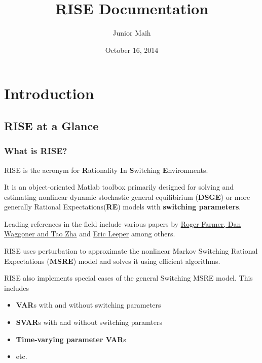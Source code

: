 \documentclass[letterpaper,10pt,english]{sphinxmanual}
\title{RISE Documentation}
\date{October 16, 2014}
\author{Junior Maih}
\begin{document}
\maketitle
\tableofcontents
{}\label{master_doc::doc}



\chapter{Introduction}
\label{introduction:introduction}\label{introduction::doc}\label{introduction:welcome-to-rise-s-documentation}

\section{RISE at a Glance}
\label{intro_folder/rise_at_a_glance::doc}\label{intro_folder/rise_at_a_glance:rise-at-a-glance}

\subsection{What is RISE?}
\label{intro_folder/rise_at_a_glance:what-is-rise}
RISE is the acronym for \textbf{R}ationality \textbf{I}n \textbf{S}witching \textbf{E}nvironments.

It is an object-oriented Matlab toolbox primarily designed for solving and estimating nonlinear
dynamic stochastic general equilibirium (\textbf{DSGE}) or more generally
Rational Expectations(\textbf{RE}) models with \textbf{switching parameters}.

Leading references in the field include various papers by \href{http://www.tzha.net/articles}{Roger Farmer, Dan Waggoner and Tao Zha}
and \href{http://php.indiana.edu/~eleeper/\#Papers}{Eric Leeper} among others.

RISE uses perturbation to approximate the nonlinear Markov Switching Rational
Expectations (\textbf{MSRE}) model and solves it using efficient algorithms.

RISE also implements special cases of the general Switching MSRE model. This includes
\begin{itemize}
\item {} 
\textbf{VAR}s with and without switching parameters

\item {} 
\textbf{SVAR}s with and without switching paramters

\item {} 
\textbf{Time-varying parameter VAR}s

\item {} 
etc.

\end{itemize}
\end{document}
